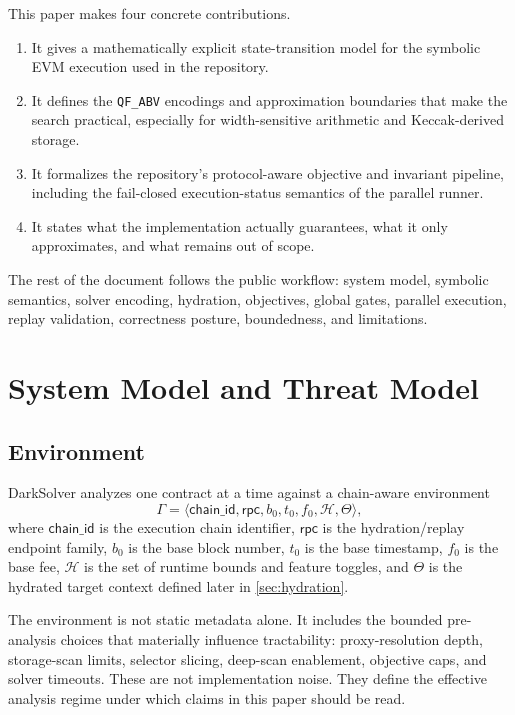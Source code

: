 \documentclass[11pt]{article}
\numberwithin{equation}{section}
\theoremstyle{remark}
\newcommand{\QFABV}{\texttt{QF\_ABV}}
\newcommand{\Ctx}{\Theta}
\newcommand{\Heur}{\mathcal{H}}
\begin{document}
This paper makes four concrete contributions.
\begin{enumerate}[leftmargin=1.5em]
  \item It gives a mathematically explicit state-transition model for the symbolic EVM execution used in the repository.
  \item It defines the \QFABV{} encodings and approximation boundaries that make the search practical, especially for width-sensitive arithmetic and Keccak-derived storage.
  \item It formalizes the repository's protocol-aware objective and invariant pipeline, including the fail-closed execution-status semantics of the parallel runner.
  \item It states what the implementation actually guarantees, what it only approximates, and what remains out of scope.
\end{enumerate}

The rest of the document follows the public workflow: system model, symbolic semantics, solver encoding, hydration, objectives, global gates, parallel execution, replay validation, correctness posture, boundedness, and limitations.

\section{System Model and Threat Model}

\subsection{Environment}

DarkSolver analyzes one contract at a time against a chain-aware environment
\begin{equation}
\Gamma = \langle \mathsf{chain\_id}, \mathsf{rpc}, b_0, t_0, f_0, \Heur, \Ctx \rangle,
\label{eq:environment}
\end{equation}
where \(\mathsf{chain\_id}\) is the execution chain identifier, \(\mathsf{rpc}\) is the hydration/replay endpoint family, \(b_0\) is the base block number, \(t_0\) is the base timestamp, \(f_0\) is the base fee, \(\Heur\) is the set of runtime bounds and feature toggles, and \(\Ctx\) is the hydrated target context defined later in \cref{sec:hydration}.

The environment is not static metadata alone. It includes the bounded pre-analysis choices that materially influence tractability: proxy-resolution depth, storage-scan limits, selector slicing, deep-scan enablement, objective caps, and solver timeouts. These are not implementation noise. They define the effective analysis regime under which claims in this paper should be read.
\end{document}
